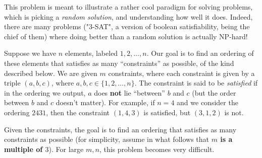 \documentclass[addpoints, 11pt]{exam}
\begin{document}
\begin{questions}
  This problem is meant to illustrate a rather cool paradigm for solving problems, which is picking a {\em random solution}, and understanding how well it does. Indeed, there are many problems ("3-SAT", a version of boolean satisfiability, being the chief of them) where doing better than a random solution is actually NP-hard!

  Suppose we have $n$ elements, labeled $1, 2, \dots, n$. Our goal is to find an ordering of these elements that satisfies as many ``constraints'' as possible, of the kind described below. We are given $m$ constraints, where each constraint is given by a triple $(a, b, c)$, where $a, b, c \in \{1, 2, \dots, n\}$. The constraint is said to be {\em satisfied} if in the ordering we output, $a$ does {\bf not} lie ``between'' $b$ and $c$ (but the order between $b$ and $c$ doesn't matter).  For example, if $n=4$ and we consider the ordering $2 4 3 1$, then the constraint $(1, 4, 3)$ is satisfied, but $(3, 1, 2)$ is not.

  Given the constraints, the goal is to find an ordering that satisfies as many constraints as possible (for simplicity, assume in what follows that {\bf $m$ is a multiple of $3$}). For large $m, n$, this problem becomes very difficult.
\end{questions}
\end{document}
